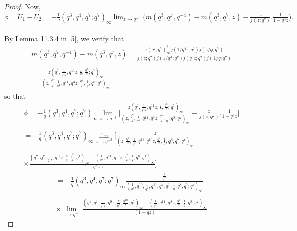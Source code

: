\documentclass[10pt,reqno]{amsart}
\begin{document}
\begin{proof}
Now, $\phi=U_1-U_2=-\displaystyle\frac{1}{q}(q^3,q^4,q^7;q^7)_{\infty}\lim_{z\to q^{-3}}\Bigg(m(q^3,q^7,q^{-4})-m(q^3,q^7,z)-\displaystyle\frac{z}{j(z;q^7)}.\displaystyle\frac{1}{1-q^3z}\Bigg).$ \\ \\
By Lemma 11.3.4 in [5], we verify that 
\begin{multline*}
    m(q^3,q^7,q^{-4})-m(q^3,q^7,z)=\displaystyle\frac{z(q^7;q^7)_{\infty}^3j(1/q^4z;q^7)j(z/q;q^7)}{j(z;q^7)j(1/q^4;q^7)j(q^3z;q^7)j(1/q;q^7)}\\ \\
    =\displaystyle\frac{z(q^7,\displaystyle\frac{1}{q^4z},q^{11}z,\displaystyle\frac{z}{q},\displaystyle\frac{q^8}{z};q^7)_{\infty}}{(z,\displaystyle\frac{q^7}{z},\displaystyle\frac{1}{q^4},q^{11},q^3z,\displaystyle\frac{q^4}{z},\displaystyle\frac{1}{q},q^8;q^7)_{\infty}}
\end{multline*}
so that 
\begin{multline*}
    \phi=-\displaystyle\frac{1}{q}(q^3,q^4,q^7;q^7)_{\infty}\lim_{z\to q^{-3}}\Bigg[\displaystyle\frac{z(q^7,\displaystyle\frac{1}{q^4z},q^{11}z,\displaystyle\frac{z}{q},\displaystyle\frac{q^8}{z};q^7)_{\infty}}{(z,\displaystyle\frac{q^7}{z},\displaystyle\frac{1}{q^4},q^{11},q^3z,\displaystyle\frac{q^4}{z},\displaystyle\frac{1}{q},q^8;q^7)_{\infty}}-\displaystyle\frac{z}{j(z;q^7)}.\displaystyle\frac{1}{1-q^3z}\Bigg]
\\ \\
    =-\displaystyle\frac{1}{q}(q^3,q^4,q^7;q^7)_{\infty}\lim_{z\to q^{-3}}\Bigg[\displaystyle\frac{z}{(z,\displaystyle\frac{q^7}{z},\displaystyle\frac{1}{q^4},q^{11},q^{10}z,\displaystyle\frac{q^4}{z},\displaystyle\frac{1}{q},q^8,q^7;q^7)_{\infty}} 
\\ \\
    \times\displaystyle\frac{(q^7,q^7,\displaystyle\frac{1}{q^4z},q^{11}z,\displaystyle\frac{z}{q},\displaystyle\frac{q^8}{z};q^7)_{\infty}-(\displaystyle\frac{1}{q^4},q^{11},q^{10}z,\displaystyle\frac{q^4}{z},\displaystyle\frac{1}{q},q^8;q^7)_{\infty}}{(1-q^3z)}\Bigg]
\end{multline*}
\begin{multline*}
    =-\displaystyle\frac{1}{q}(q^3,q^4,q^7;q^7)_{\infty}\displaystyle\frac{\displaystyle\frac{1}{q^3}}{(\displaystyle\frac{1}{q^3},q^{10},\displaystyle\frac{1}{q^4},q^{11},q^7,q^7,\displaystyle\frac{1}{q},q^8,q^7;q^7)_{\infty}} \\ \\
    \times\lim_{z\to q^{-1}}\displaystyle\frac{(q^7,q^7,\displaystyle\frac{1}{q^2z},q^{9}z,\displaystyle\frac{z}{q^3},\displaystyle\frac{q^{10}}{z};q^7)_{\infty}-(\displaystyle\frac{1}{q^4},q^{11},q^{8}z,\displaystyle\frac{q^6}{z},\displaystyle\frac{1}{q},q^8;q^7)_{\infty}}{(1-qz)}

\end{multline*}
\end{proof}
\end{document}
